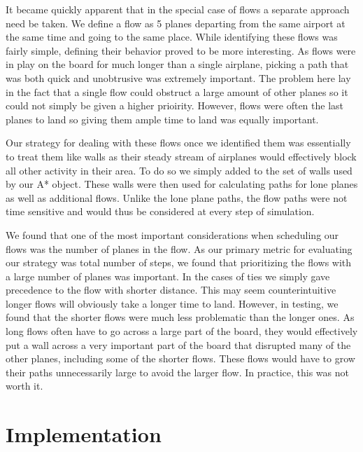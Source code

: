 \documentclass[10pt]{article}
\begin{document}
It became quickly apparent that in the special case of flows a separate approach need be taken. We define a flow as 5 planes departing from the same airport at the same time and going to the same place. While identifying these flows was fairly simple, defining their behavior proved to be more interesting. As flows were in play on the board for much longer than a single airplane, picking a path that was both quick and unobtrusive was extremely important. The problem here lay in the fact that a single flow could obstruct a large amount of other planes so it could not simply be given a higher prioirity. However, flows were often the last planes to land so giving them ample time to land was equally important.

Our strategy for dealing with these flows once we identified them was essentially to treat them like walls as their steady stream of airplanes would effectively block all other activity in their area. To do so we simply added to the set of walls used by our A* object. These walls were then used for calculating paths for lone planes as well as additional flows. Unlike the lone plane paths, the flow paths were not time sensitive and would thus be considered at every step of simulation.

We found that one of the most important considerations when scheduling our flows was the number of planes in the flow. As our primary metric for evaluating our strategy was total number of steps, we found that prioritizing the flows with a large number of planes was important. In the cases of ties we simply gave precedence to the flow with shorter distance. This may seem counterintuitive longer flows will obviously take a longer time to land. However, in testing, we found that the shorter flows were much less problematic than the longer ones. As long flows often have to go across a large part of the board, they would effectively put a wall across a very important part of the board that disrupted many of the other planes, including some of the shorter flows. These flows would have to grow their paths unnecessarily large to avoid the larger flow. In practice, this was not worth it.

\newpage
\section{Implementation}
\end{document}
